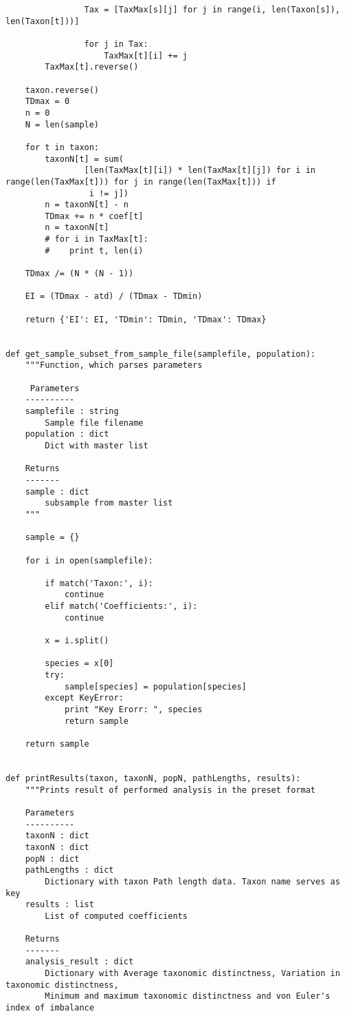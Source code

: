 \documentclass[a4paper,11pt]{article}
\begin{document}
\begin{lstlisting}
                Tax = [TaxMax[s][j] for j in range(i, len(Taxon[s]), len(Taxon[t]))]

                for j in Tax:
                    TaxMax[t][i] += j
        TaxMax[t].reverse()

    taxon.reverse()
    TDmax = 0
    n = 0
    N = len(sample)

    for t in taxon:
        taxonN[t] = sum(
                [len(TaxMax[t][i]) * len(TaxMax[t][j]) for i in range(len(TaxMax[t])) for j in range(len(TaxMax[t])) if
                 i != j])
        n = taxonN[t] - n
        TDmax += n * coef[t]
        n = taxonN[t]
        # for i in TaxMax[t]:
        #    print t, len(i)

    TDmax /= (N * (N - 1))

    EI = (TDmax - atd) / (TDmax - TDmin)

    return {'EI': EI, 'TDmin': TDmin, 'TDmax': TDmax}


def get_sample_subset_from_sample_file(samplefile, population):
    """Function, which parses parameters

     Parameters
    ----------
    samplefile : string
        Sample file filename
    population : dict
        Dict with master list

    Returns
    -------
    sample : dict
        subsample from master list
    """

    sample = {}

    for i in open(samplefile):

        if match('Taxon:', i):
            continue
        elif match('Coefficients:', i):
            continue

        x = i.split()

        species = x[0]
        try:
            sample[species] = population[species]
        except KeyError:
            print "Key Erorr: ", species
            return sample

    return sample


def printResults(taxon, taxonN, popN, pathLengths, results):
    """Prints result of performed analysis in the preset format

    Parameters
    ----------
    taxonN : dict
    taxonN : dict
    popN : dict
    pathLengths : dict
        Dictionary with taxon Path length data. Taxon name serves as key
    results : list
        List of computed coefficients

    Returns
    -------
    analysis_result : dict
        Dictionary with Average taxonomic distinctness, Variation in taxonomic distinctness,
        Minimum and maximum taxonomic distinctness and von Euler's index of imbalance


\end{lstlisting}
\end{document}
